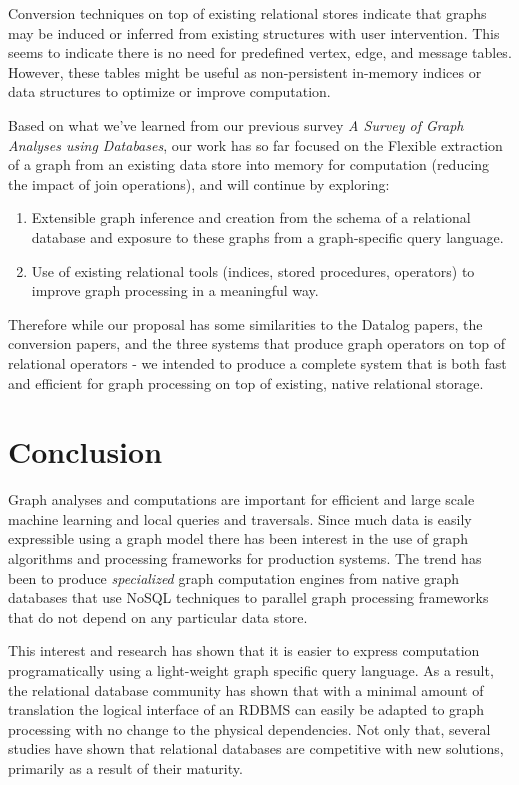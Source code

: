 \documentclass[11pt,letterpaper]{article}
\begin{document}
Conversion techniques on top of existing relational stores indicate that graphs may be induced or inferred from existing structures with user intervention. This seems to indicate there is no need for predefined vertex, edge, and message tables. However, these tables might be useful as non-persistent in-memory indices or data structures to optimize or improve computation.

Based on what we've learned from our previous survey \textit{A Survey of Graph Analyses using Databases}, our work has so far focused on the Flexible extraction of a graph from an existing data store into memory for computation (reducing the impact of join operations), and will continue by exploring:

\begin{enumerate}
	\item Extensible graph inference and creation from the schema of a relational database and exposure to these graphs from a graph-specific query language.
	\item Use of existing relational tools (indices, stored procedures, operators) to improve graph processing in a meaningful way.
\end{enumerate}

Therefore while our proposal has some similarities to the Datalog papers, the conversion papers, and the three systems that produce graph operators on top of relational operators - we intended to produce a complete system that is both fast and efficient for graph processing on top of existing, native relational storage.

\section*{Conclusion}

Graph analyses and computations are important for efficient and large scale machine learning and local queries and traversals. Since much data is easily expressible using a graph model there has been interest in the use of graph algorithms and processing frameworks for production systems. The trend has been to produce \textit{specialized} graph computation engines from native graph databases that use NoSQL techniques to parallel graph processing frameworks that do not depend on any particular data store.

This interest and research has shown that it is easier to express computation programatically using a light-weight graph specific query language. As a result, the relational database community has shown that with a minimal amount of translation the logical interface of an RDBMS can easily be adapted to graph processing with no change to the physical dependencies. Not only that, several studies have shown that relational databases are competitive with new solutions, primarily as a result of their maturity.
\end{document}

